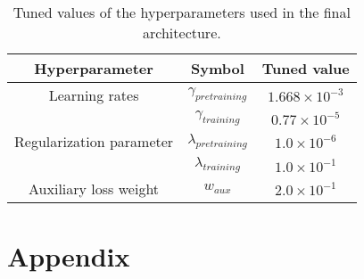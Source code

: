 \documentclass[10pt,conference,compsocconf]{IEEEtran}
\begin{document}
\begin{table}[H]
\begin{tabular}{|c|c|c|}
  \hline
  Hyperparameter 			& Symbol 				& Tuned value \\
  \hline
  Learning rates 			& $\gamma_{pretraining}$ 	& $1.668 \times 10^{-3}$ \\
						& $\gamma_{training}$		& $0.77 \times 10^{-5}$ \\
  Regularization parameter 	& $\lambda_{pretraining}$ 	& $1.0 \times 10^{-6}$  \\
						& $\lambda_{training}$		& $1.0 \times 10^{-1}$  \\
  Auxiliary loss weight 		& $w_{aux}$ 				& $2.0 \times 10^{-1}$ \\
  \hline
\end{tabular}
\caption{Tuned values of the hyperparameters used in the final architecture.}
\end{table}


%
%

\section{Appendix}
\end{document}
